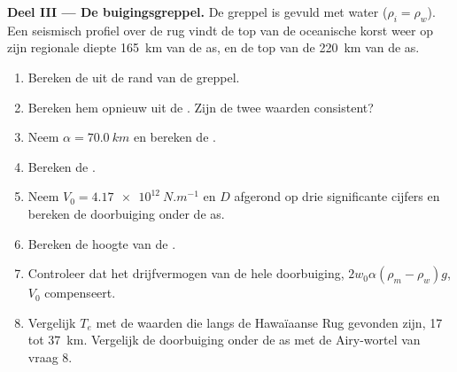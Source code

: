 \begin{problem}
\noindent\textbf{Deel III --- De buigingsgreppel.} De greppel is gevuld met water
($\rho_i = \rho_w$). Een seismisch profiel over de rug vindt de top van de
oceanische korst weer op zijn regionale diepte \qty{165}{km} van de as, en de
top van de  \qty{220}{km} van de as.
\begin{enumerate}[resume]
  \item Bereken de  uit de rand van de greppel.
  \item Bereken hem opnieuw uit de . Zijn de twee waarden consistent?
  \item Neem $\alpha = \qty{70.0}{km}$ en bereken de .
  \item Bereken de .
  \item Neem $V_0 = \qty{4.17e12}{N.m^{-1}}$ en $D$ afgerond op drie
        significante cijfers en bereken de doorbuiging onder de as.
  \item Bereken de hoogte van de .
  \item Controleer dat het drijfvermogen van de hele doorbuiging, $2w_0\alpha(\rho_m -
        \rho_w)g$, $V_0$ compenseert.
  \item Vergelijk $T_e$ met de waarden die langs de Hawaïaanse Rug gevonden zijn, 17 tot
        \qty{37}{km}. Vergelijk de doorbuiging onder de as met de
        Airy-wortel van vraag 8.
\end{enumerate}


\end{problem}
